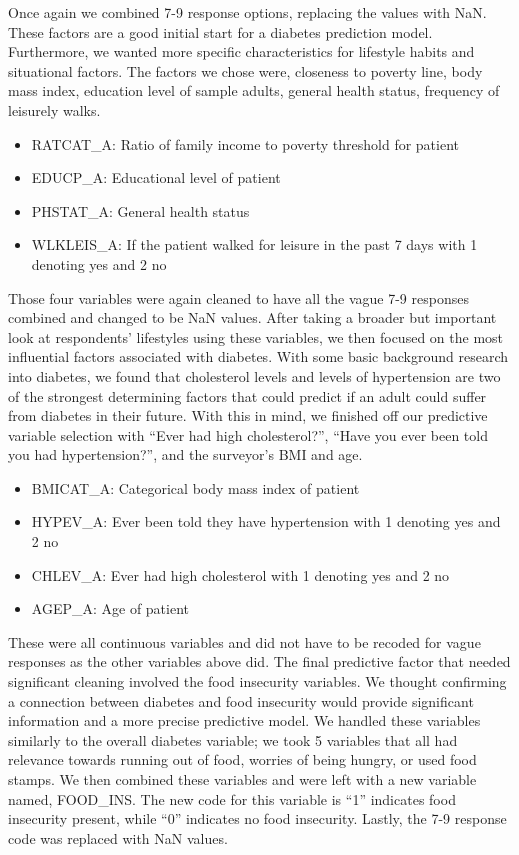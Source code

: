 \documentclass{article}
\theoremstyle{plain}
\theoremstyle{definition}
\theoremstyle{remark}
\begin{document}
Once again we combined 7-9 response options, replacing the values with NaN. These factors are a good initial start for a diabetes prediction model. Furthermore, we wanted more specific characteristics for lifestyle habits and situational factors. The factors we chose were, closeness to poverty line, body mass index, education level of sample adults, general health status, frequency of leisurely walks.
\begin{itemize}
    \item RATCAT\_A: Ratio of family income to poverty threshold for patient
    \item EDUCP\_A: Educational level of patient
    \item PHSTAT\_A: General health status
    \item WLKLEIS\_A: If the patient walked for leisure in the past 7 days with 1 denoting yes and 2 no
\end{itemize}
Those four variables were again cleaned to have all the vague 7-9 responses combined and changed to be NaN values. 
After taking a broader but important look at respondents’ lifestyles using these variables, we then focused on the most influential factors associated with diabetes.  With some basic background research into diabetes, we found that cholesterol levels and levels of hypertension are two of the strongest determining factors that could predict if an adult could suffer from diabetes in their future. With this in mind, we finished off our predictive variable selection with “Ever had high cholesterol?”, “Have you ever been told you had hypertension?”, and the surveyor's BMI and age.  
\begin{itemize}
    \item BMICAT\_A: Categorical body mass index of patient
    \item HYPEV\_A: Ever been told they have hypertension with 1 denoting yes and 2 no
    \item CHLEV\_A: Ever had high cholesterol with 1 denoting yes and 2 no
    \item AGEP\_A: Age of patient
\end{itemize}
These were all continuous variables and did not have to be recoded for vague responses as the other variables above did.
The final predictive factor that needed significant cleaning involved the food insecurity variables. We thought confirming a connection between diabetes and food insecurity would provide significant information and a more precise predictive model. We handled these variables similarly to the overall diabetes variable; we took 5 variables that all had relevance towards running out of food, worries of being hungry, or used food stamps. We then combined these variables and were left with a new variable named, FOOD\_INS. The new code for this variable is “1” indicates food insecurity present, while “0” indicates no food insecurity. Lastly, the 7-9 response code was replaced with NaN values. 
\end{document}
